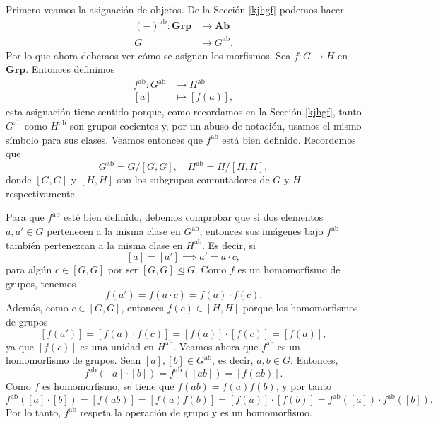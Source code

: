 \medskip
\noindent Primero veamos la asignación de objetos. De la Sección \ref{kjhgf} podemos hacer 
\begin{align*}
	(-)^{\operatorname{ab}}: \mathbf{Grp}&\longrightarrow  \mathbf{Ab}\\
	G&\longmapsto G^{\operatorname{ab}}.
\end{align*}
Por lo que ahora debemos ver cómo se asignan los morfismos. Sea \(f: G\to H\) en \(\mathbf{Grp}\). Entonces definimos
\begin{align*}
	f^{\operatorname{ab}}:G^{\operatorname{ab}}&\longrightarrow H^{\operatorname{ab}}\\
	[a]&\longmapsto [f(a)],
\end{align*}
esta asignación tiene sentido porque, como recordamos en la Sección \ref{kjhgf}, tanto \(G^{\operatorname{ab}}\) como \(H^{\operatorname{ab}}\) son grupos cocientes y, por un abuso de notación, usamos el mismo símbolo para sus clases. Veamos entonces que \(f^{\operatorname{ab}}\) está bien definido. Recordemos que 
\[
G^{\operatorname{ab}} = G / [G, G], \quad H^{\operatorname{ab}} = H / [H, H],
\]
donde \([G,G]\) y \([H,H]\) son los subgrupos conmutadores de \(G\) y \(H\) respectivamente.

\medskip
\noindent Para que \(f^{\operatorname{ab}}\) esté bien definido, debemos comprobar que si dos elementos \(a, a' \in G\) pertenecen a la misma clase en \(G^{\operatorname{ab}}\), entonces sus imágenes bajo \(f^{\operatorname{ab}}\) también pertenezcan a la misma clase en \(H^{\operatorname{ab}}\). Es decir, si 
\[
[a] = [a'] \implies a' = a \cdot c,
\]
para algún \(c \in [G, G]\) por ser $[G,G]\trianglelefteq G$. Como \(f\) es un homomorfismo de grupos, tenemos
\[
f(a') = f(a \cdot c) = f(a) \cdot f(c).
\]Además, como \(c \in [G,G]\), entonces \(f(c) \in [H,H]\) porque los homomorfismos de grupos 
\[
[f(a')] = [f(a) \cdot f(c)] = [f(a)] \cdot [f(c)] = [f(a)],
\] ya que $[f(c)]$ es una unidad en $H^{\operatorname{ab}}$. Veamos ahora que \(f^{\operatorname{ab}}\) es un homomorfismo de grupos. Sean \( [a], [b] \in G^{\operatorname{ab}} \), es decir, \( a, b \in G \). Entonces,
\[
f^{\operatorname{ab}}([a] \cdot [b]) = f^{\operatorname{ab}}([ab]) = [f(ab)].
\]
Como \(f\) es homomorfismo, se tiene que \(f(ab) = f(a)f(b)\), y por tanto
\[
f^{\operatorname{ab}}([a] \cdot [b]) = [f(ab)] = [f(a)f(b)] = [f(a)] \cdot [f(b)] = f^{\operatorname{ab}}([a]) \cdot f^{\operatorname{ab}}([b]).
\]
Por lo tanto, \(f^{\operatorname{ab}}\) respeta la operación de grupo y es un homomorfismo.

